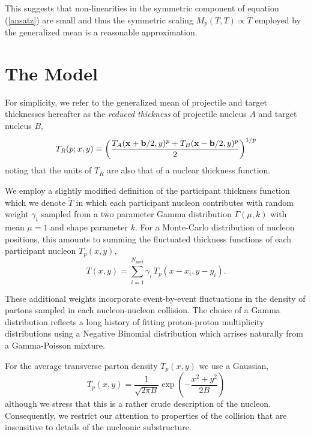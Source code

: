 \documentclass[aps,prl,reprint,amsmath,nofootinbib]{revtex4-1}
\begin{document}
This suggests that non-linearities in the symmetric component of equation (\ref{ansatz}) are small and thus the symmetric scaling $M_p(T,T) \propto T$ employed by the generalized mean
is a reasonable approximation.

\cite{constraining-ic}

\section{The Model}

For simplicity, we refer to the generalized mean of projectile and target thicknesses hereafter as the \emph{reduced thickness} of projectile nucleus $A$ and 
target nucleus $B$,
\begin{equation}
 \label{reduced}
 T_R(p;x,y) \equiv \left( \frac{T_A({\bf x}+{\bf b}/2,y)^p + T_B({\bf x}-{\bf b}/2,y)^p}{2} \right)^{1/p}
\end{equation}
noting that the units of $T_R$ are also that of a nuclear thickness function. 

We employ a slightly modified definition of the participant thickness function which we denote $\tilde{T}$ in which each participant nucleon contributes with random 
weight $\gamma_i$ sampled from a two parameter Gamma distribution $\Gamma(\mu,k)$ with mean $\mu=1$ and shape parameter $k$. For a Monte-Carlo distribution of nucleon 
positions, this amounts to summing the fluctuated thickness functions of each participant nucleon $T_p(x,y)$,
\begin{equation}
 \label{fluctuated thickness}
 T(x,y) = \sum\limits_{i=1}^{N_{part}} \gamma_i\, T_p(x-x_i,y-y_i).
\end{equation}

These additional weights incorporate event-by-event fluctuations in the density of partons sampled in each nucleon-nucleon collision. The choice of
a Gamma distribution reflects a long history of fitting proton-proton multiplicity distributions using a Negative Binomial distribution which arrises naturally 
from a Gamma-Poisson mixture.

For the average transverse parton density $T_p(x,y)$ we use a Gaussian,
\begin{equation}
 T_p(x,y) = \frac{1}{\sqrt{2 \pi B}} \exp\left(-\frac{x^2+y^2}{2 B}\right) 
\end{equation}
although we stress that this is a rather crude description of the nucleon. Consequently, we restrict our attention to properties of the collision that are insensitive to details 
of the nucleonic substructure.
\end{document}
